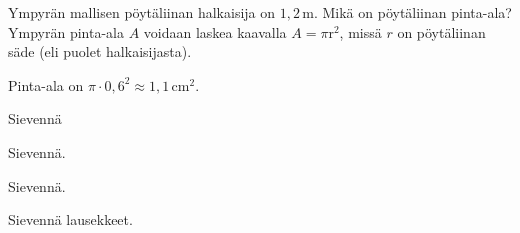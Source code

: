 \begin{tehtavasivu}
    \begin{tehtava}
        Ympyrän mallisen pöytäliinan halkaisija on $1,2$\,m.  Mikä on pöytäliinan pinta-ala? Ympyrän pinta-ala $A$ voidaan laskea kaavalla $A=\pi\text{r}^2$, missä $r$ on pöytäliinan säde (eli puolet halkaisijasta).
        \begin{vastaus}
        Pinta-ala on $\pi \cdot 0,6^2 \approx 1,1\,$cm$^2$.
        \end{vastaus}
\end{tehtava}

 \begin{tehtava}
        Sievennä

        \begin{vastaus}
        \end{vastaus}
    \end{tehtava}
    \begin{tehtava}
        Sievennä.
        \begin{vastaus}
        \end{vastaus}
    \end{tehtava}

    \begin{tehtava}
        Sievennä.
        \begin{vastaus}
        \end{vastaus}
    \end{tehtava}
      
    \begin{tehtava}
        Sievennä lausekkeet.
        \begin{vastaus}
        \end{vastaus}
    \end{tehtava}
    

\end{tehtavasivu}
